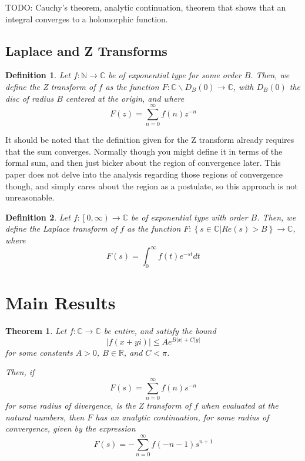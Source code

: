 \documentclass{article}
\newtheorem{definition}{Definition}
\newtheorem{theorem}{Theorem}
\begin{document}
	TODO: Cauchy's theorem, analytic continuation, theorem that shows that an integral converges to a holomorphic function.


	

	\subsection{Laplace and Z Transforms}

	\begin{definition} \label{ def_Z_Transform }
		Let $ f : \mathbb{N} \rightarrow \mathbb{C} $ be of exponential type for some order $B$. Then, we define the Z transform of $f$ as the function $F : \mathbb{C} \backslash D_{B}(0) \rightarrow \mathbb{C}$, with $D_{B}(0)$ the disc of radius $B$ centered at the origin, and where
		$$ F \left( z \right) = \sum_{n = 0}^{\infty} f \left( n \right) z^{-n} $$
	\end{definition}

	It should be noted that the definition given for the Z transform already requires that the sum converges. Normally though you might define it in terms of the formal sum, and then just bicker about the region of convergence later. This paper does not delve into the analysis regarding those regions of convergence though, and simply cares about the region as a postulate, so this approach is not unreasonable. 
	
	\begin{definition} \label{ def_Laplace_Transform }
		Let $ f : \left[ 0, \infty \right) \rightarrow \mathbb{C}$ be of exponential type with order $B$. Then, we define the Laplace transform of $f$ as the function $ F : \left\{ s \in \mathbb{C} | Re(s) > B \right\} \rightarrow \mathbb{C}$, where
		$$ F(s) = \int_{0}^{\infty} f(t) e^{-s t} dt $$
	\end{definition}

	\section{ Main Results }
	
	\begin{theorem} \label{z_transform_analytic_continuation}
		 Let $f : \mathbb{C} \rightarrow \mathbb{C}$ be entire, and satisfy the bound $$ \left| f(x + y i ) \right| \leq A e^{ B \left| x \right| + C \left| y \right| } $$ for some constants $A > 0$, $B \in \mathbb{R}$, and $C < \pi$.
		 
		 
		 Then, if $$F(s) = \sum_{n=0}^{\infty} f(n) s^{-n} $$ for some radius of divergence, is the Z transform of $f$ when evaluated at the natural numbers, then $F$ has an analytic continuation, for some radius of convergence, given by the expression 
		 $$ F(s) = -\sum_{n=0}^{\infty} f(-n-1) s^{n+1} $$
	\end{theorem}
\end{document}
